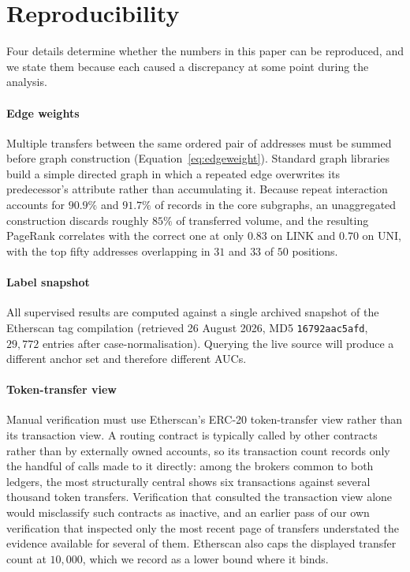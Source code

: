 \documentclass[final,5p,times]{elsarticle}
\begin{document}
\FloatBarrier
\section{Reproducibility}
\label{app:repro}

Four details determine whether the numbers in this paper can be reproduced,
and we state them because each caused a discrepancy at some point during the
analysis.

\paragraph{Edge weights} Multiple transfers between the same ordered pair
of addresses must be summed before graph construction
(Equation~\ref{eq:edgeweight}). Standard graph libraries build a simple
directed graph in which a repeated edge overwrites its predecessor's
attribute rather than accumulating it. Because repeat interaction accounts
for $90.9\%$ and $91.7\%$ of records in the core subgraphs, an unaggregated
construction discards roughly $85\%$ of transferred volume, and the
resulting PageRank correlates with the correct one at only $0.83$ on LINK
and $0.70$ on UNI, with the top fifty addresses overlapping in $31$ and $33$
of $50$ positions.

\paragraph{Label snapshot} All supervised results are computed against a
single archived snapshot of the Etherscan tag compilation (retrieved 26
August 2026, MD5 \texttt{16792aac5afd}, $29{,}772$ entries after
case-normalisation). Querying the live source will produce a different
anchor set and therefore different AUCs.

\paragraph{Token-transfer view}
Manual verification must use Etherscan's ERC-20 token-transfer view rather
than its transaction view. A routing contract is typically called by other
contracts rather than by externally owned accounts, so its transaction count
records only the handful of calls made to it directly: among the brokers
common to both ledgers, the most structurally central shows six transactions
against several thousand token transfers. Verification that consulted the
transaction view alone would misclassify such contracts as inactive, and an
earlier pass of our own verification that inspected only the most recent
page of transfers understated the evidence available for several of them.
Etherscan also caps the displayed transfer count at $10{,}000$, which we
record as a lower bound where it binds.
\end{document}
